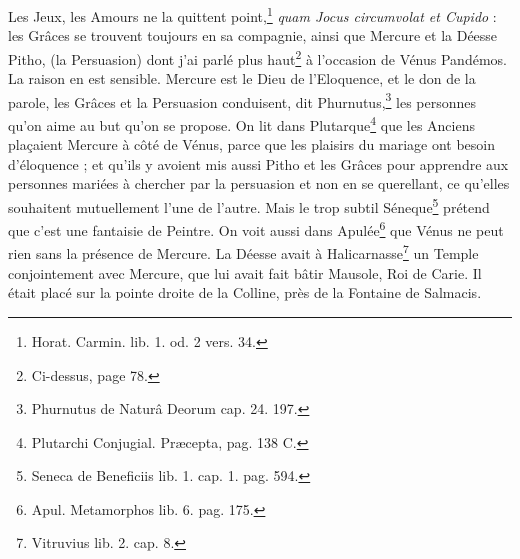 \documentclass[a4paper, 18pt, oneside]{article}
\begin{document}
Les Jeux, les Amours ne la quittent point,\footnote{Horat. Carmin. lib. 1. od. 2 vers. 34.} \emph{quam Jocus circumvolat et Cupido} : les Grâces se trouvent toujours en sa compagnie, ainsi que Mercure et la Déesse Pitho, (la Persuasion) dont j'ai parlé plus haut\footnote{Ci-dessus, page 78.} à l'occasion de Vénus Pandémos. La raison en est sensible. Mercure est le Dieu de l'Eloquence, et le don de la parole, les Grâces et la Persuasion conduisent, dit Phurnutus,\footnote{Phurnutus de Naturâ Deorum cap. 24. 197.} les personnes qu'on aime au but qu'on se propose. On lit dans Plutarque\footnote{Plutarchi Conjugial. Præcepta, pag. 138 C.} que les Anciens plaçaient Mercure à côté de Vénus, parce que les plaisirs du mariage ont besoin d'éloquence ; et qu'ils y avoient mis aussi Pitho et les Grâces pour apprendre aux personnes mariées à chercher par la persuasion et non en se querellant, ce qu'elles souhaitent mutuellement l'une de l'autre. Mais le trop subtil Séneque\footnote{Seneca de Beneficiis lib. 1. cap. 1. pag. 594.} prétend que c'est une fantaisie de Peintre. On voit aussi dans Apulée\footnote{Apul. Metamorphos lib. 6. pag. 175.} que Vénus ne peut rien sans la présence de Mercure. La Déesse avait à Halicarnasse\footnote{Vitruvius lib. 2. cap. 8.} un Temple conjointement avec Mercure, que lui avait fait bâtir Mausole, Roi de Carie. Il était placé sur la pointe droite de la Colline, près de la Fontaine de Salmacis.
\end{document}
